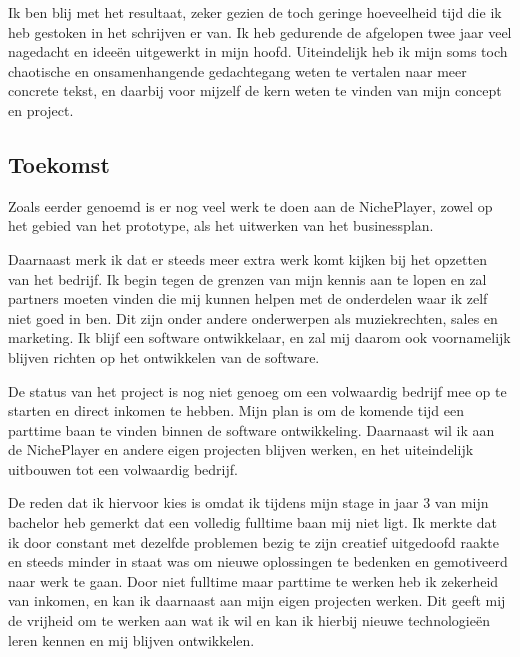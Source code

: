 Ik ben blij met het resultaat, zeker gezien de toch geringe hoeveelheid tijd die ik heb gestoken in het schrijven er van. Ik heb gedurende de afgelopen twee jaar veel nagedacht en ideeën uitgewerkt in mijn hoofd. Uiteindelijk heb ik mijn soms toch chaotische en onsamenhangende gedachtegang weten te vertalen naar meer concrete tekst, en daarbij voor mijzelf de kern weten te vinden van mijn concept en project.

\subsection{Toekomst}
Zoals eerder genoemd is er nog veel werk te doen aan de NichePlayer, zowel op het gebied van het prototype, als het uitwerken van het businessplan.

Daarnaast merk ik dat er steeds meer extra werk komt kijken bij het opzetten van het bedrijf. Ik begin tegen de grenzen van mijn kennis aan te lopen en zal partners moeten vinden die mij kunnen helpen met de onderdelen waar ik zelf niet goed in ben. Dit zijn onder andere onderwerpen als muziekrechten, sales en marketing. Ik blijf een software ontwikkelaar, en zal mij daarom ook voornamelijk blijven richten op het ontwikkelen van de software.

De status van het project is nog niet genoeg om een volwaardig bedrijf mee op te starten en direct inkomen te hebben. Mijn plan is om de komende tijd een parttime baan te vinden binnen de software ontwikkeling. Daarnaast wil ik aan de NichePlayer en andere eigen projecten blijven werken, en het uiteindelijk uitbouwen tot een volwaardig bedrijf.

De reden dat ik hiervoor kies is omdat ik tijdens mijn stage in jaar 3 van mijn bachelor heb gemerkt dat een volledig fulltime baan mij niet ligt. Ik merkte dat ik door constant met dezelfde problemen bezig te zijn creatief uitgedoofd raakte en steeds minder in staat was om nieuwe oplossingen te bedenken en gemotiveerd naar werk te gaan. Door niet fulltime maar parttime te werken heb ik zekerheid van inkomen, en kan ik daarnaast aan mijn eigen projecten werken. Dit geeft mij de vrijheid om te werken aan wat ik wil en kan ik hierbij nieuwe technologieën leren kennen en mij blijven ontwikkelen.

